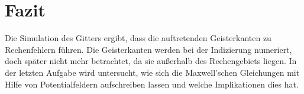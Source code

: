\chapter{Fazit}\label{sec:fazit}
Die Simulation des Gitters ergibt, dass die auftretenden Geisterkanten zu Rechenfehlern führen. Die Geisterkanten werden bei der Indizierung numeriert, doch später nicht mehr betrachtet, da sie außerhalb des Rechengebiets liegen. In der letzten Aufgabe wird untersucht, wie sich die Maxwell'schen Gleichungen mit Hilfe von Potentialfeldern aufschreiben lassen und welche Implikationen dies hat.